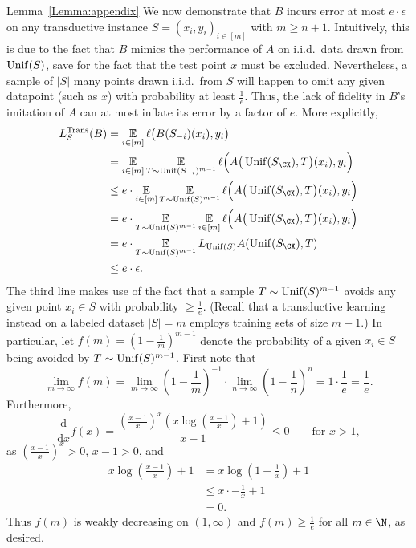 \documentclass[11pt]{article}
\begin{document}
\begin{proofof}{Lemma~\ref{Lemma:appendix}}
We now demonstrate that $B$ incurs error at most $e \cdot \epsilon$ on any transductive instance $S = (x_i, y_i)_{i \in [m]}$ with $m \geq n + 1$. Intuitively, this is due to the fact that $B$ mimics the performance of $A$ on i.i.d.\ data drawn from $\operatorname{Unif}(S)$, save for the fact that the test point $x$ must be excluded. Nevertheless, a sample of $|S|$ many points drawn i.i.d.\ from $S$ will happen to omit any given datapoint (such as $x$) with probability at least $\frac{1}{e}$. Thus, the lack of fidelity in $B$'s imitation of $A$ can at most inflate its error by a factor of $e$. More explicitly, 
\begingroup
\allowdisplaybreaks
\begin{align*}
L_{S}^{\Trans}(B) &= \E_{i \in [m]} \ell \big( B(S_{-i})(x_i), y_i \big) \\
&= \E_{i \in [m]} \E_{T \sim \Unif(S_{-i})^{m-1}} \ell \Big( A\big(\Unif(S_\CX), T\big)(x_i), y_i \Big) \\
&\leq e \cdot  \E_{i \in [m]} \E_{T \sim \Unif(S)^{m-1}} \ell \Big( A\big(\Unif(S_\CX), T\big)(x_i), y_i \Big) \\
&= e \cdot \E_{T \sim \Unif(S)^{m-1}} \E_{i \in [m]} \ell \Big( A\big(\Unif(S_\CX), T\big)(x_i), y_i \Big) \\ 
&= e \cdot \E_{T \sim \Unif(S)^{m-1}} L_{\Unif(S)} A(\Unif(S_\CX), T) \\
&\leq e \cdot \epsilon.
\end{align*}
\endgroup
The third line makes use of the fact that a sample $T \sim \operatorname{Unif}(S)^{m-1}$ avoids any given point $x_{i} \in S$ with probability $\geq \frac{1}{e}$. (Recall that a transductive learning instead on a labeled dataset $|S| = m$ employs training sets of size $m-1$.) In particular, let $f(m) = (1 - \frac{1}{m})^{m-1}$ denote the probability of a given $x_i \in S$ being avoided by $T \sim \operatorname{Unif}(S)^{m-1}$. First note that 
\[ \lim_{m\to \infty} f(m) = \lim_{m \to \infty} \left (1 - \frac 1m \right )^{-1} \cdot \lim_{n \to \infty} \left( 1 - \frac 1n \right) ^n =  1 \cdot \frac 1e  = \frac 1e.\]
Furthermore,
\[ \frac{\mathrm{d}}{\mathrm{d} x} f(x) = \frac{\left(\frac{x-1}{x}\right)^x \left( x \log \left( \frac{x-1}{x} \right) + 1 \right)}{x - 1} \leq 0 \qquad \text{for } x > 1, \]
as $\left( \frac{x-1}{x} \right)^x > 0$, $x - 1 > 0$, and 
\begin{align*}
x \log \left( \frac{x-1}{x} \right) + 1 &= x \log \left( 1 - \frac{1}{x} \right) + 1 \\
&\leq x \cdot - \frac 1x + 1 \\
&= 0. 
\end{align*}
Thus $f(m)$ is weakly decreasing on $(1, \infty)$ and $f(m) \geq \frac 1e$ for all $m \in \N$, as desired. 
\end{proofof}
\end{document}
